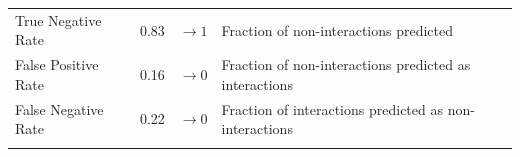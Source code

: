 \documentclass[11pt]{article}
\begin{document}
\begin{longtable}[]{@{}llll@{}}
\begin{minipage}[t]{0.21\columnwidth}\raggedright
True Negative Rate\strut
\end{minipage} & \begin{minipage}[t]{0.05\columnwidth}\raggedright
0.83\strut
\end{minipage} & \begin{minipage}[t]{0.13\columnwidth}\raggedright
\(\rightarrow 1\)\strut
\end{minipage} & \begin{minipage}[t]{0.49\columnwidth}\raggedright
Fraction of non-interactions predicted\strut
\end{minipage}\tabularnewline
\begin{minipage}[t]{0.21\columnwidth}\raggedright
False Positive Rate\strut
\end{minipage} & \begin{minipage}[t]{0.05\columnwidth}\raggedright
0.16\strut
\end{minipage} & \begin{minipage}[t]{0.13\columnwidth}\raggedright
\(\rightarrow 0\)\strut
\end{minipage} & \begin{minipage}[t]{0.49\columnwidth}\raggedright
Fraction of non-interactions predicted as interactions\strut
\end{minipage}\tabularnewline
\begin{minipage}[t]{0.21\columnwidth}\raggedright
False Negative Rate\strut
\end{minipage} & \begin{minipage}[t]{0.05\columnwidth}\raggedright
0.22\strut
\end{minipage} & \begin{minipage}[t]{0.13\columnwidth}\raggedright
\(\rightarrow 0\)\strut
\end{minipage} & \begin{minipage}[t]{0.49\columnwidth}\raggedright
Fraction of interactions predicted as non-interactions\strut
\end{minipage}\tabularnewline
\begin{minipage}[t]{0.21\columnwidth}\raggedright
\strut
\end{minipage} & \begin{minipage}[t]{0.05\columnwidth}\raggedright
\strut
\end{minipage} & \begin{minipage}[t]{0.13\columnwidth}\raggedright
\strut
\end{minipage} & \begin{minipage}[t]{0.49\columnwidth}\raggedright

\end{minipage}
\end{longtable}
\end{document}
